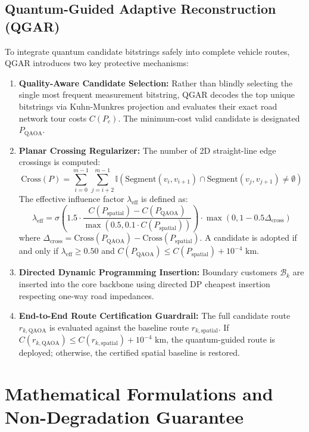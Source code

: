 \documentclass[journal,10pt]{IEEEtran}
\begin{document}
\subsection{Quantum-Guided Adaptive Reconstruction (QGAR)}
To integrate quantum candidate bitstrings safely into complete vehicle routes, QGAR introduces two key protective mechanisms:
\begin{enumerate}
    \item \textbf{Quality-Aware Candidate Selection:} Rather than blindly selecting the single most frequent measurement bitstring, QGAR decodes the top unique bitstrings via Kuhn-Munkres projection \cite{kuhn1955hungarian} and evaluates their exact road network tour costs $C(P_c)$. The minimum-cost valid candidate is designated $P_{\text{QAOA}}$.
    \item \textbf{Planar Crossing Regularizer:} The number of 2D straight-line edge crossings is computed:
    \begin{equation}
    \text{Cross}(P) = \sum_{i=0}^{m-1} \sum_{j=i+2}^{m-1} \mathbb{I}(\text{Segment}(v_i, v_{i+1}) \cap \text{Segment}(v_j, v_{j+1}) \ne \emptyset)
    \end{equation}
    The effective influence factor $\lambda_{\text{eff}}$ is defined as:
    \begin{equation}
    \label{eq:lambda}
    \lambda_{\text{eff}} = \sigma\left(1.5 \cdot \frac{C(P_{\text{spatial}}) - C(P_{\text{QAOA}})}{\max(0.5, 0.1 \cdot C(P_{\text{spatial}}))}\right) \cdot \max(0, 1 - 0.5 \Delta_{\text{cross}})
    \end{equation}
    where $\Delta_{\text{cross}} = \text{Cross}(P_{\text{QAOA}}) - \text{Cross}(P_{\text{spatial}})$. A candidate is adopted if and only if $\lambda_{\text{eff}} \ge 0.50$ and $C(P_{\text{QAOA}}) \le C(P_{\text{spatial}}) + 10^{-4}\text{ km}$.
    \item \textbf{Directed Dynamic Programming Insertion:} Boundary customers $\mathcal{B}_k$ are inserted into the core backbone using directed DP cheapest insertion respecting one-way road impedances.
    \item \textbf{End-to-End Route Certification Guardrail:} The full candidate route $r_{k, \text{QAOA}}$ is evaluated against the baseline route $r_{k, \text{spatial}}$. If $C(r_{k, \text{QAOA}}) \le C(r_{k, \text{spatial}}) + 10^{-4}\text{ km}$, the quantum-guided route is deployed; otherwise, the certified spatial baseline is restored.
\end{enumerate}

\section{Mathematical Formulations and Non-Degradation Guarantee}
\end{document}
